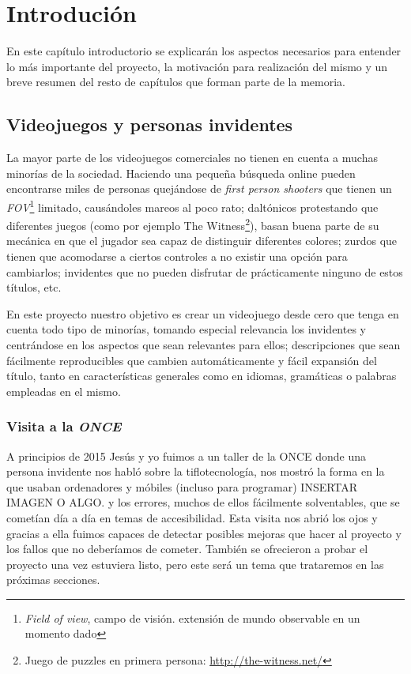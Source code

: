 \chapter[Introdución]{Introdución}

En este capítulo introductorio se explicarán los aspectos necesarios para entender lo más importante del proyecto, la motivación para realización del mismo y un breve resumen del resto de capítulos que forman parte de la memoria.

\section{Videojuegos y personas invidentes}
La mayor parte de los videojuegos comerciales no tienen en cuenta a muchas minorías de la sociedad. Haciendo una pequeña búsqueda online pueden encontrarse miles de personas quejándose de \textit{first person shooters} que tienen un \textit{FOV}\footnote{\textit{Field of view}, campo de visión. extensión de mundo observable en un momento dado} limitado, causándoles mareos al poco rato; daltónicos protestando que diferentes juegos (como por ejemplo The Witness\footnote{Juego de puzzles en primera persona: \url{http://the-witness.net/}}), basan buena parte de su mecánica en que el jugador sea capaz de distinguir diferentes colores; zurdos que tienen que acomodarse a ciertos controles a no existir una opción para cambiarlos; invidentes que no pueden disfrutar de prácticamente ninguno de estos títulos, etc.

En este proyecto nuestro objetivo es crear un videojuego desde cero que tenga en cuenta todo tipo de minorías, tomando especial relevancia los invidentes y centrándose en los aspectos que sean relevantes para ellos; descripciones que sean fácilmente reproducibles que cambien automáticamente y fácil expansión del título, tanto en características generales como en idiomas, gramáticas o palabras empleadas en el mismo.

\subsection{Visita a la \textit{ONCE}}
A principios de 2015 Jesús y yo fuimos a un taller de la ONCE donde una persona invidente nos habló sobre la tiflotecnología, nos mostró la forma en la que usaban ordenadores y móbiles (incluso para programar) INSERTAR IMAGEN O ALGO. y los errores, muchos de ellos fácilmente solventables, que se cometían día a día en temas de accesibilidad. Esta visita nos abrió los ojos y gracias a ella fuimos capaces de detectar posibles mejoras que hacer al proyecto y los fallos que no deberíamos de cometer. También se ofrecieron a probar el proyecto una vez estuviera listo, pero este será un tema que trataremos en las próximas secciones.

